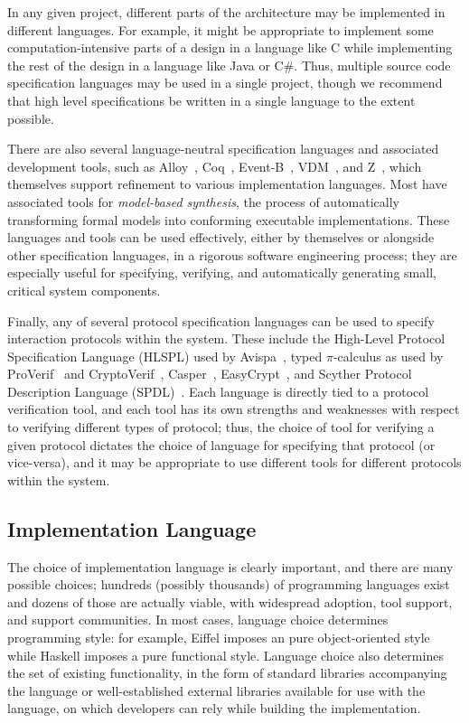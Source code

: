 In any given project, different parts of the architecture may be
implemented in different languages. For example, it might be
appropriate to implement some computation-intensive parts of a design
in a language like C while implementing the rest of the design in a
language like Java or C\#. Thus, multiple source code specification
languages may be used in a single project, though we recommend that
high level specifications be written in a single language to the
extent possible.

There are also several language-neutral specification languages and
associated development tools, such as Alloy~\cite{Alloy},
Coq~\cite{Coq}, Event-B~\cite{Abrial10}, VDM~\cite{VDM}, and
Z~\cite{Zed}, which themselves support refinement to various
implementation languages. Most have associated tools for
\emph{model-based synthesis}, the process of automatically
transforming formal models into conforming executable
implementations. These languages and tools can be used effectively,
either by themselves or alongside other specification languages, in a
rigorous software engineering process; they are especially useful for
specifying, verifying, and automatically generating small, critical
system components.

Finally, any of several protocol specification languages can be used
to specify interaction protocols within the system. These include
the High-Level Protocol Specification Language (HLSPL) used by
Avispa~\cite{Avispa}, typed $\pi$-calculus as used by
ProVerif~\cite{ProVerif} and CryptoVerif~\cite{CryptoVerif},
Casper~\cite{Casper}, EasyCrypt~\cite{EasyCrypt}, and Scyther Protocol
Description Language (SPDL)~\cite{Scyther}. Each language is directly
tied to a protocol verification tool, and each tool has its own
strengths and weaknesses with respect to verifying different types of
protocol; thus, the choice of tool for verifying a given protocol
dictates the choice of language for specifying that protocol (or
vice-versa), and it may be appropriate to use different tools for
different protocols within the system.

\subsection{Implementation Language}

The choice of implementation language is clearly important, and there
are many possible choices; hundreds (possibly thousands) of
programming languages exist and dozens of those are actually viable,
with widespread adoption, tool support, and support communities. In
most cases, language choice determines programming style: for example,
Eiffel imposes an pure object-oriented style while Haskell imposes a
pure functional style. Language choice also determines the set of
existing functionality, in the form of standard libraries accompanying
the language or well-established external libraries available for use
with the language, on which developers can rely while building the
implementation. 

